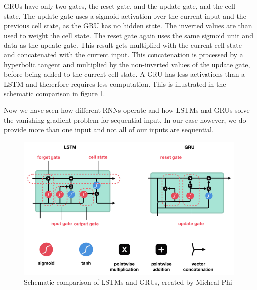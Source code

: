 \documentclass[
	ngerman,
	ruledheaders=section,%
	class=report,%
	thesis={type=bachelor},%
	accentcolor=9c,%
	custommargins=true,%
	marginpar=false,%
	parskip=half-,%
	fontsize=11pt,%
]{tudapub}
\begin{document}
GRUs have only two gates, the reset gate, and the update gate, and the cell state. \cite{phiIllustratedGuideLSTM2020}
The update gate uses a sigmoid activation over the current input and the previous cell state, as the GRU has no hidden state.
The inverted values are than used to weight the cell state.
The reset gate again uses the same sigmoid unit and data as the update gate.
This result gets multiplied with the current cell state and concatenated with the current input.
This concatenation is processed by a hyperbolic tangent and multiplied by the non-inverted values of the update gate, before being added to the current cell state.
A GRU has less activations than a LSTM and thererfore requires less computation.
This is illustrated in the schematic comparison in figure \ref{fig:LSTMvGRU}.

Now we have seen how different RNNs operate and how LSTMs and GRUs solve the vanishing gradient problem for sequential input.
In our case however, we do provide more than one input and not all of our inputs are sequential.

\begin{figure}
    \includegraphics[width=\textwidth]{LSTMvGRU.png}
    \caption{Schematic comparison of LSTMs and GRUs, created by Micheal Phi \cite{phiIllustratedGuideLSTM2020}}
    \label{fig:LSTMvGRU}
\end{figure}


\end{document}
